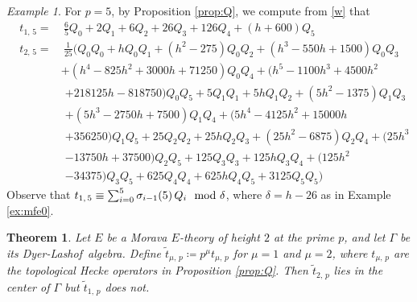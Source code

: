 \documentclass{gtpart}
\newtheorem{thm}[equation]{Theorem}
\theoremstyle{definition}
\theoremstyle{remark}
\newtheorem{ex}[equation]{Example}
\newcommand{\DL}{Dyer-Lashof~}
\newcommand{\md}{~~{\rm mod}~}
\renewcommand{\d}{\delta}
\newcommand{\G}{\Gamma}
\newcommand{\si}{\sigma}
\newcommand{\ce}{\coloneqq}
\renewcommand{\=}{\approx}
\renewcommand{\-}{\sim}
\numberwithin{equation}{section}
\begin{document}
\begin{ex}
 \label{ex:t5}
 For $p = 5$, by Proposition \ref{prop:Q}, we compute from \eqref{w} that 
 \begin{equation*}
  \begin{split}
   t_{1,\,5} = & ~ \frac{6}{5} Q_0 + 2 Q_1 + 6 Q_2 + 26 Q_3 + 126 Q_4 
                 + (h + 600) Q_5 \\
   t_{2,\,5} = & ~ \frac{1}{25} \big( Q_0 Q_0 + h Q_0 Q_1 + (h^2 - 275) Q_0 Q_2 
                 + (h^3 - 550 h + 1500) Q_0 Q_3 \\
               & + (h^4 - 825 h^2 + 3000 h + 71250) Q_0 Q_4 + (h^5 - 1100 h^3 
                 + 4500 h^2 
  \end{split}
 \end{equation*}
 \begin{equation*}
  \begin{split}
  \qquad\qquad & + 218125 h - 818750) Q_0 Q_5 + 5 Q_1 Q_1 + 5 h Q_1 Q_2 + (5 h^2 
                 - 1375) Q_1 Q_3 \\
               & + (5 h^3 - 2750 h + 7500) Q_1 Q_4 + (5 h^4 - 4125 h^2 
                 + 15000 h \\
               & + 356250) Q_1 Q_5 + 25 Q_2 Q_2 + 25 h Q_2 Q_3 + (25 h^2 
                 - 6875) Q_2 Q_4 + (25 h^3 \\
               & - 13750 h + 37500) Q_2 Q_5 + 125 Q_3 Q_3 + 125 h Q_3 Q_4 
                 + (125 h^2 \\
               & - 34375) Q_3 Q_5 + 625 Q_4 Q_4 + 625 h Q_4 Q_5 
                 + 3125 Q_5 Q_5 \big) 
  \end{split}
 \end{equation*}
 Observe that $t_{1,\,5} \equiv \sum_{i = 0}^5 \si_{i - 1}(5) \, Q_i \md \d$, 
 where $\d = h - 26$ as in Example \ref{ex:mfe0}.  
\end{ex}

\begin{thm}
 \label{thm:center}
 Let $E$ be a Morava $E$-theory of height $2$ at the prime $p$, and let $\G$ be 
 its \DL algebra.  Define $\tilde{t}_{\mu,\,p} \ce p^\mu t_{\mu,\,p}$ for 
 $\mu = 1$ and $\mu = 2$, where $t_{\mu,\,p}$ are the topological Hecke 
 operators in Proposition \ref{prop:Q}.  Then $\tilde{t}_{2,\,p}$ lies in the 
 center of $\G$ but $\tilde{t}_{1,\,p}$ does not.  
\end{thm}
\end{document}
